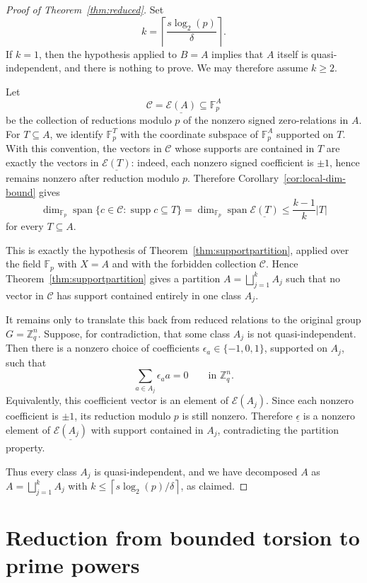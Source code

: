 \documentclass[11pt]{amsart}
\newcommand{\Z}{\mathbb{Z}}
\newcommand{\F}{\mathbb{F}}
\DeclareMathOperator{\Span}{span}
\begin{document}
\begin{proof}[Proof of Theorem~\ref{thm:reduced}]
Set
$$
        k=\left\lceil \frac{s\log_2(p)}{\delta}\right\rceil.
$$
If \(k=1\), then the hypothesis applied to \(B=A\) implies that \(A\) itself is quasi-independent, and there is nothing to prove. We may therefore assume \(k\geq 2\).

Let
$$
        \mathcal C=\underline{\mathcal E(A)}\subseteq \F_p^A
$$
be the collection of reductions modulo $p$ of the nonzero signed zero-relations in $A$. For $T\subseteq A$, we identify $\F_p^T$ with the coordinate subspace of $\F_p^A$ supported on $T$. With this convention, the vectors in $\mathcal C$ whose supports are contained in $T$ are exactly the vectors in $\underline{\mathcal E(T)}$: indeed, each nonzero signed coefficient is $\pm1$, hence remains nonzero after reduction modulo $p$. Therefore Corollary~\ref{cor:local-dim-bound} gives
$$
        \dim_{\F_p}\Span\{c\in\mathcal C:\operatorname{supp}c\subseteq T\}
        =
        \dim_{\F_p}\Span \underline{\mathcal E(T)}
        \leq \frac{k-1}{k}|T|
$$
for every $T\subseteq A$.

This is exactly the hypothesis of Theorem~\ref{thm:supportpartition}, applied over the field $\F_p$ with $X=A$ and with the forbidden collection $\mathcal C$. Hence Theorem~\ref{thm:supportpartition} gives a partition
$A=\bigsqcup_{j=1}^k A_j$ such that no vector in $\mathcal C$ has support contained entirely in one class $A_j$.

It remains only to translate this back from reduced relations to the original group \(G=\Z_q^n\). Suppose, for contradiction, that some class \(A_j\) is not quasi-independent. Then there is a nonzero choice of coefficients \(\epsilon_a\in\{-1,0,1\}\), supported on \(A_j\), such that
$$
        \sum_{a\in A_j}\epsilon_a a=0
        \qquad \text{in } \Z_q^n.
$$
Equivalently, this coefficient vector is an element of \(\mathcal E(A_j)\). Since each nonzero coefficient is \(\pm1\), its reduction modulo \(p\) is still nonzero. Therefore \(\underline{\epsilon}\) is a nonzero element of \(\underline{\mathcal E(A_j)}\) with support contained in \(A_j\), contradicting the partition property.

Thus every class \(A_j\) is quasi-independent, and we have decomposed
\(A\) as \(A=\bigsqcup_{j=1}^k A_j\) with \(k\leq \left\lceil s\log_2(p)/\delta\right\rceil\), as claimed.
\end{proof}



\section{Reduction from bounded torsion to prime powers}
\label{sec:bourgain-reduction}
\end{document}
